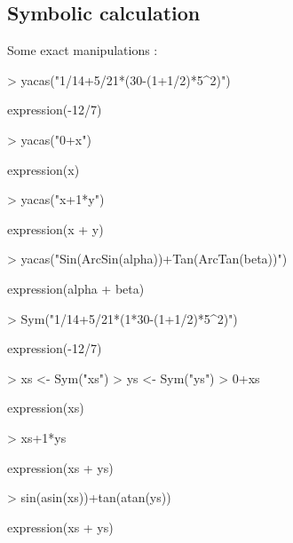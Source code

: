 \documentclass[]{article}
\begin{document}
\subsection{Symbolic calculation}
\label{sec:symbolicCalculation}

Some exact manipulations :
\begin{Schunk}
\begin{Sinput}
> yacas("1/14+5/21*(30-(1+1/2)*5^2)")
\end{Sinput}
\begin{Soutput}
expression(-12/7)
\end{Soutput}
\begin{Sinput}
> yacas("0+x")
\end{Sinput}
\begin{Soutput}
expression(x)
\end{Soutput}
\begin{Sinput}
> yacas("x+1*y")
\end{Sinput}
\begin{Soutput}
expression(x + y)
\end{Soutput}
\begin{Sinput}
> yacas("Sin(ArcSin(alpha))+Tan(ArcTan(beta))")
\end{Sinput}
\begin{Soutput}
expression(alpha + beta)
\end{Soutput}
\end{Schunk}

\begin{Schunk}
\begin{Sinput}
> Sym("1/14+5/21*(1*30-(1+1/2)*5^2)")
\end{Sinput}
\begin{Soutput}
expression(-12/7)
\end{Soutput}
\begin{Sinput}
> xs <- Sym("xs")
> ys <- Sym("ys")
> 0+xs
\end{Sinput}
\begin{Soutput}
expression(xs)
\end{Soutput}
\begin{Sinput}
> xs+1*ys
\end{Sinput}
\begin{Soutput}
expression(xs + ys)
\end{Soutput}
\begin{Sinput}
> sin(asin(xs))+tan(atan(ys))
\end{Sinput}
\begin{Soutput}
expression(xs + ys)
\end{Soutput}
\end{Schunk}
\end{document}
